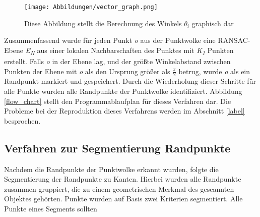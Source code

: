 \begin{figure}[t]
	\texttt{[image: Abbildungen/vector\_graph.png]}
	\centering
	\caption{Diese Abbildung stellt die Berechnung des Winkels $\theta_i$ graphisch dar}
	\label{vector_graph}
\end{figure}

Zusammenfassend wurde für jeden Punkt \textit{o} aus der Punktwolke eine RANSAC-Ebene \textit{E\textsubscript{N}} aus einer lokalen Nachbarschaften des Punktes mit \textit{K\textsubscript{1}} Punkten erstellt. Falls \textit{o} in der Ebene lag, und der größte Winkelabstand zwischen Punkten der Ebene mit \textit{o} als den Ursprung größer als $\frac{\pi}{2}$ betrug, wurde \textit{o} als ein Randpunkt markiert und gespeichert. Durch die Wiederholung dieser Schritte für alle Punkte wurden alle Randpunkte der Punktwolke identifiziert. Abbildung \ref{flow_chart} stellt den Programmablaufplan für dieses Verfahren dar. Die Probleme bei der Reproduktion dieses Verfahrens werden im Abschnitt \ref{label} besprochen.

\subsection{Verfahren zur Segmentierung Randpunkte}
Nachdem die Randpunkte der Punktwolke erkannt wurden, folgte die Segmentierung der Randpunkte zu Kanten. Hierbei wurden alle Randpunkte zusammen gruppiert, die zu einem geometrischen Merkmal des gescannten Objektes gehörten. Punkte wurden auf Basis zwei Kriterien segmentiert. Alle Punkte eines Segments sollten 
